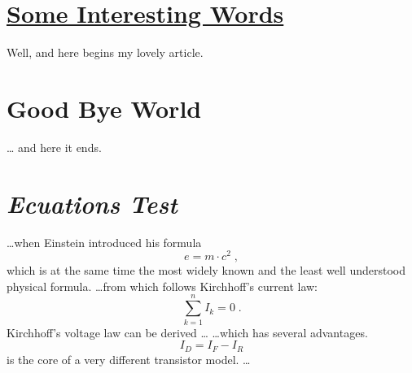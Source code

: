 \section{\underline{Some Interesting Words}}
Well, and here begins my lovely article.
\section{Good Bye World}
\ldots{} and here it ends.

\section{\emph{Ecuations Test}}
\ldots when Einstein introduced his formula
\begin{equation}
e = m \cdot c^2 \; ,
\end{equation}
which is at the same time the most widely known
and the least well understood physical formula.
\ldots from which follows Kirchhoff’s current law:
\begin{equation}
\sum_{k=1}^{n} I_k = 0 \; .
\end{equation}
Kirchhoff’s voltage law can be derived \ldots
\ldots which has several advantages.
\begin{equation}
I_D = I_F - I_R
\end{equation}
is the core of a very different transistor model. \ldots



